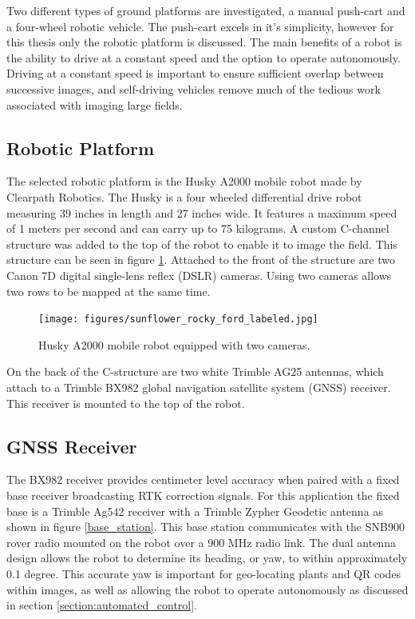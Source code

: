 Two different types of ground platforms are investigated, a manual push-cart and a four-wheel robotic vehicle.  The push-cart excels in it's simplicity, however for this thesis only the robotic platform is discussed.  The main benefits of a robot is the ability to drive at a constant speed and the option to operate autonomously.  Driving at a constant speed is important to ensure sufficient overlap between successive images, and self-driving vehicles remove much of the tedious work associated with imaging large fields.  

\subsection{Robotic Platform}

The selected robotic platform is the Husky A2000 mobile robot made by Clearpath Robotics.  The Husky is a four wheeled differential drive robot measuring 39 inches in length and 27 inches wide.  It features a maximum speed of 1 meters per second and can carry up to 75 kilograms.  A custom C-channel structure was added to the top of the robot to enable it to image the field.  This structure can be seen in figure \ref{husky_rocky_ford}.  Attached to the front of the structure are two Canon 7D digital single-lens reflex (DSLR) cameras.  Using two cameras allows two rows to be mapped at the same time. 

\begin{figure}[htb]
	\centering
    \texttt{[image: figures/sunflower\_rocky\_ford\_labeled.jpg]}
    \caption[Husky]{Husky A2000 mobile robot equipped with two cameras.}
    \label{husky_rocky_ford}
\end{figure}

On the back of the C-structure are two white Trimble AG25 antennas, which attach to a Trimble BX982 global navigation satellite system (GNSS) receiver.  This receiver is mounted to the top of the robot.   

\subsection{GNSS Receiver}

The BX982 receiver provides centimeter level accuracy when paired with a fixed base receiver broadcasting RTK correction signals.  For this application the fixed base is a Trimble Ag542 receiver with a Trimble Zypher Geodetic antenna as shown in figure \ref{base_station}.  This base station communicates with the SNB900 rover radio mounted on the robot over a 900 MHz radio link.   The dual antenna design allows the robot to determine its heading, or yaw, to within approximately 0.1 degree.  This accurate yaw is important for geo-locating plants and QR codes within images, as well as allowing the robot to operate autonomously as discussed in section \ref{section:automated_control}. 

